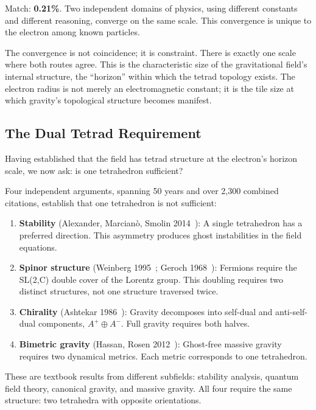 \documentclass[aps,prd,preprint,superscriptaddress,showpacs,preprintnumbers,amsmath,amssymb,nofootinbib]{revtex4-2}
\begin{document}
Match: \textbf{0.21\%}. Two independent domains of physics, using different constants and different reasoning, converge on the same scale. This convergence is unique to the electron among known particles.

The convergence is not coincidence; it is constraint. There is exactly one scale where both routes agree. This is the characteristic size of the gravitational field's internal structure, the ``horizon'' within which the tetrad topology exists. The electron radius is not merely an electromagnetic constant; it is the tile size at which gravity's topological structure becomes manifest.

\subsection{The Dual Tetrad Requirement}
\label{subsec:dual}

Having established that the field has tetrad structure at the electron's horizon scale, we now ask: is one tetrahedron sufficient?

Four independent arguments, spanning 50 years and over 2,300 combined citations, establish that one tetrahedron is not sufficient:

\begin{enumerate}
\item \textbf{Stability} (Alexander, Marcian\`o, Smolin 2014~\cite{alexander2014}): A single tetrahedron has a preferred direction. This asymmetry produces ghost instabilities in the field equations.

\item \textbf{Spinor structure} (Weinberg 1995~\cite{weinberg1995}; Geroch 1968~\cite{geroch1968}): Fermions require the SL(2,C) double cover of the Lorentz group. This doubling requires two distinct structures, not one structure traversed twice.

\item \textbf{Chirality} (Ashtekar 1986~\cite{ashtekar1986}): Gravity decomposes into self-dual and anti-self-dual components, $A^+ \oplus A^-$. Full gravity requires both halves.

\item \textbf{Bimetric gravity} (Hassan, Rosen 2012~\cite{hassan2012}): Ghost-free massive gravity requires two dynamical metrics. Each metric corresponds to one tetrahedron.
\end{enumerate}

These are textbook results from different subfields: stability analysis, quantum field theory, canonical gravity, and massive gravity. All four require the same structure: two tetrahedra with opposite orientations.
\end{document}
